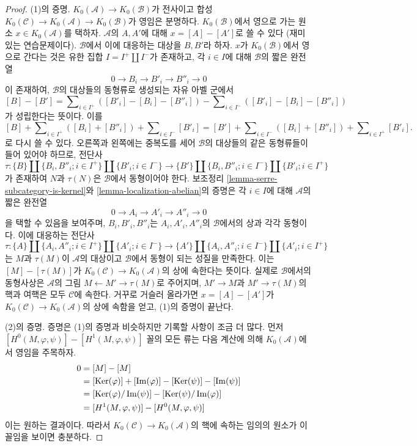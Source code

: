 \begin{proof}
(1)의 증명. $K_0(\mathcal{A}) \to K_0(\mathcal{B})$가 전사이고 합성
$K_0(\mathcal{C}) \to K_0(\mathcal{A}) \to K_0(\mathcal{B})$가
영임은 분명하다. $K_0(\mathcal{B})$에서 영으로 가는 원소
$x \in K_0(\mathcal{A})$를 택하자.
$\mathcal{A}$의 $A, A'$에 대해 $x = [A] - [A']$로 쓸 수 있다
(재미있는 연습문제이다). $\mathcal{B}$에서 이에 대응하는 대상을
$B, B'$라 하자. $x$가 $K_0(\mathcal{B})$에서 영으로 간다는 것은
유한 집합 $I = I^+ \amalg I^{-}$가 존재하고, 각 $i \in I$에 대해
$\mathcal{B}$의 짧은 완전열
$$
0 \to B_i \to B'_i \to B''_i \to 0
$$
이 존재하여, $\mathcal{B}$의 대상들의 동형류로 생성되는 자유 아벨
군에서
$$
[B] - [B'] = \sum\nolimits_{i \in I^{+}} ([B'_i] - [B_i] - [B''_i])
-
\sum\nolimits_{i \in I^{-}} ([B'_i] - [B_i] - [B''_i])
$$
가 성립한다는 뜻이다. 이를
$$
[B]
+ \sum\nolimits_{i \in I^{+}} ([B_i] + [B''_i])
+ \sum\nolimits_{i \in I^{-}} [B'_i]
=
[B']
+ \sum\nolimits_{i \in I^{-}} ([B_i] + [B''_i])
+ \sum\nolimits_{i \in I^{+}} [B'_i].
$$
로 다시 쓸 수 있다. 오른쪽과 왼쪽에는 중복도를 세어
$\mathcal{B}$의 대상들의 같은 동형류들이 들어 있어야 하므로,
전단사
$$
\tau :
\{B\} \amalg \{B_i, B''_i; i \in I^+\} \amalg \{B'_i; i \in I^-\}
\longrightarrow
\{B'\} \amalg \{B_i, B''_i; i \in I^-\} \amalg \{B'_i; i \in I^+\}
$$
가 존재하여 $N$과 $\tau(N)$은 $\mathcal{B}$에서 동형이어야 한다.
보조정리 \ref{lemma-serre-subcategory-is-kernel}와
\ref{lemma-localization-abelian}의 증명은 각 $i \in I$에 대해
$\mathcal{A}$의 짧은 완전열
$$
0 \to A_i \to A'_i \to A''_i \to 0
$$
을 택할 수 있음을 보여주며, $B_i, B'_i, B''_i$는
$A_i, A'_i, A''_i$의 $\mathcal{B}$에서의 상과 각각 동형이다.
이에 대응하는 전단사
$$
\tau :
\{A\} \amalg \{A_i, A''_i; i \in I^+\} \amalg \{A'_i; i \in I^-\}
\longrightarrow
\{A'\} \amalg \{A_i, A''_i; i \in I^-\} \amalg \{A'_i; i \in I^+\}
$$
는 $M$과 $\tau(M)$이 $\mathcal{A}$의 대상이고 $\mathcal{B}$에서
동형이 되는 성질을 만족한다. 이는
$[M] - [\tau(M)]$가 $K_0(\mathcal{C}) \to K_0(\mathcal{A})$의
상에 속한다는 뜻이다. 실제로 $\mathcal{B}$에서의 동형사상은
$\mathcal{A}$의 그림 $M \leftarrow M' \rightarrow \tau(M)$로
주어지며, $M' \to M$과 $M' \to \tau(M)$의 핵과 여핵은 모두
$\mathcal{C}$에 속한다. 거꾸로 거슬러 올라가면
$x = [A] - [A']$가 $K_0(\mathcal{C}) \to K_0(\mathcal{A})$의 상에
속함을 얻고, (1)의 증명이 끝난다.

\medskip\noindent
(2)의 증명. 증명은 (1)의 증명과 비슷하지만 기록할 사항이 조금 더
많다. 먼저
$[H^0(M, \varphi, \psi)] - [H^1(M, \varphi, \psi)]$ 꼴의 모든 류는
다음 계산에 의해 $K_0(\mathcal{A})$에서 영임을 주목하자.
\begin{align*}
0 & = [M] - [M] \\
& =  [\mathop{\mathrm{Ker}}(\varphi)] + [\mathop{\mathrm{Im}}(\varphi)]
- [\mathop{\mathrm{Ker}}(\psi)] - [\mathop{\mathrm{Im}}(\psi)] \\
& =
[\mathop{\mathrm{Ker}}(\varphi)/\mathop{\mathrm{Im}}(\psi)] -
[\mathop{\mathrm{Ker}}(\psi)/\mathop{\mathrm{Im}}(\varphi)] \\
& = [H^1(M, \varphi, \psi)] - [H^0(M, \varphi, \psi)]
\end{align*}
이는 원하는 결과이다. 따라서
$K_0(\mathcal{C}) \to K_0(\mathcal{A})$의 핵에 속하는 임의의 원소가
이 꼴임을 보이면 충분하다.


\end{proof}
